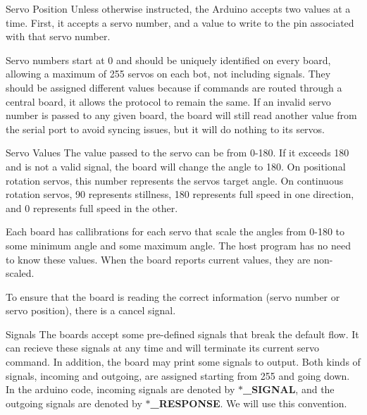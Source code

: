 \begin{DoxyParagraph}{Servo Position}
Unless otherwise instructed, the Arduino accepts two values at a time. First, it accepts a servo number, and a value to write to the pin associated with that servo number. 
\end{DoxyParagraph}
\begin{DoxyParagraph}{}
Servo numbers start at 0 and should be uniquely identified on every board, allowing a maximum of 255 servos on each bot, not including signals. They should be assigned different values because if commands are routed through a central board, it allows the protocol to remain the same. If an invalid servo number is passed to any given board, the board will still read another value from the serial port to avoid syncing issues, but it will do nothing to its servos. 
\end{DoxyParagraph}
\begin{DoxyParagraph}{Servo Values}
The value passed to the servo can be from 0-\/180. If it exceeds 180 and is not a valid signal, the board will change the angle to 180. On positional rotation servos, this number represents the servo\textquotesingle{}s target angle. On continuous rotation servos, 90 represents stillness, 180 represents full speed in one direction, and 0 represents full speed in the other. 
\end{DoxyParagraph}
\begin{DoxyParagraph}{}
Each board has callibrations for each servo that scale the angles from 0-\/180 to some minimum angle and some maximum angle. The host program has no need to know these values. When the board reports current values, they are non-\/scaled. 
\end{DoxyParagraph}
\begin{DoxyParagraph}{}
To ensure that the board is reading the correct information (servo number or servo position), there is a cancel signal.
\end{DoxyParagraph}
\begin{DoxyParagraph}{Signals}
The boards accept some pre-\/defined signals that break the default flow. It can recieve these signals at any time and will terminate its current servo command. In addition, the board may print some signals to output. Both kinds of signals, incoming and outgoing, are assigned starting from 255 and going down. In the arduino code, incoming signals are denoted by {\bfseries $\ast$\+\_\+\+S\+I\+G\+N\+A\+L}, and the outgoing signals are denoted by {\bfseries $\ast$\+\_\+\+R\+E\+S\+P\+O\+N\+S\+E}. We will use this convention.
\end{DoxyParagraph}
